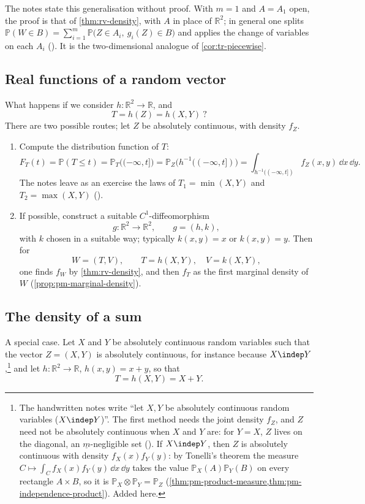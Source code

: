 The notes state this generalisation without proof. With $m=1$ and $A=A_1$ open, the proof is that of
\cref{thm:rv-density}, with $A$ in place of $\mathbb R^2$; in general one splits
$\mathbb P(W\in B)=\sum_{i=1}^m\mathbb P\big(Z\in A_i,\ g_i(Z)\in B\big)$ and applies the change of
variables on each $A_i$ (). It is the two-dimensional analogue of
\cref{cor:tr-piecewise}.

\subsection{Real functions of a random vector}\label{sec:rv-real-functions}

What happens if we consider $h:\mathbb R^2\to\mathbb R$, and
\[
  T=h(Z)=h(X,Y)\ ?
\]
There are two possible routes; let $Z$ be absolutely continuous, with density $f_Z$.
\begin{enumerate}[label=\arabic*)]
  \item Compute the distribution function of $T$:
    \[
      F_T(t)=\mathbb P(T\le t)=\mathbb P_T\big((-\infty,t]\big)=\mathbb P_Z\big(h^{-1}((-\infty,t])\big)
      =\int_{h^{-1}((-\infty,t])}f_Z(x,y)\,\dd x\,\dd y .
    \]
    The notes leave as an exercise the laws of $T_1=\min(X,Y)$ and $T_2=\max(X,Y)$
    ().
  \item If possible, construct a suitable $C^1$-diffeomorphism
    \[
      g:\mathbb R^2\to\mathbb R^2,\qquad g=(h,k),
    \]
    with $k$ chosen in a suitable way; typically $k(x,y)=x$ or $k(x,y)=y$. Then for
    \[
      W=(T,V),\qquad T=h(X,Y),\quad V=k(X,Y),
    \]
    one finds $f_W$ by \cref{thm:rv-density}, and then $f_T$ as the first marginal density of $W$
    (\cref{prop:pm-marginal-density}).
\end{enumerate}

\subsection{The density of a sum}\label{sec:rv-sums}

A special case. Let $X$ and $Y$ be absolutely continuous random variables such that the vector
$Z=(X,Y)$ is absolutely continuous, for instance because $X\indep Y$,\footnote{The handwritten notes
write ``let $X,Y$ be absolutely continuous random variables ($X\indep Y$)''. The first method needs
the joint density $f_Z$, and $Z$ need not be absolutely continuous when $X$ and $Y$ are: for $Y=X$,
$Z$ lives on the diagonal, an $\underline m$-negligible set (). If
$X\indep Y$, then $Z$ is absolutely continuous with density $f_X(x)f_Y(y)$: by Tonelli's theorem the
measure $C\mapsto\int_Cf_X(x)f_Y(y)\,\dd x\,\dd y$ takes the value $\mathbb P_X(A)\mathbb P_Y(B)$ on
every rectangle $A\times B$, so it is $\mathbb P_X\otimes\mathbb P_Y=\mathbb P_Z$
(\cref{thm:pm-product-measure,thm:pm-independence-product}). Added here.} and let
$h:\mathbb R^2\to\mathbb R$, $h(x,y)=x+y$, so that
\[
  T=h(X,Y)=X+Y .
\]

